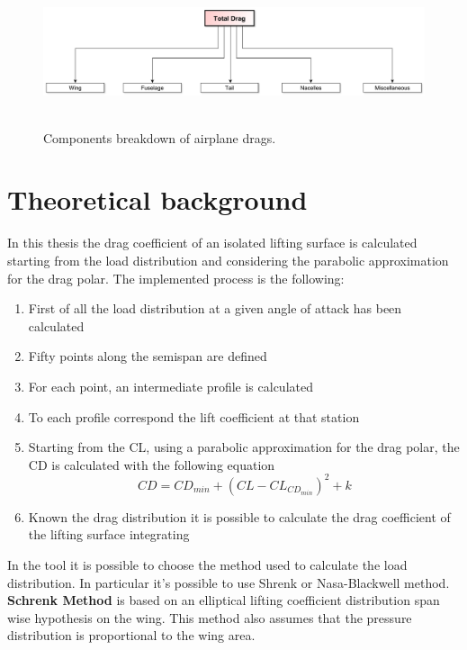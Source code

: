 \begin{figure}[H]
\centering
{\includegraphics[height=3.6cm]{Immagini/dragco.pdf}} 
\caption{Components breakdown of airplane drags.}
\end{figure}

\section{Theoretical background}

In this thesis the drag coefficient of an isolated lifting surface is calculated starting from the load distribution and considering the parabolic approximation for the drag polar. The implemented process is the following:

\begin{enumerate}
\item First of all the load distribution at a given angle of attack has been calculated
\item Fifty points along the semispan are defined
\item For each point, an intermediate profile is calculated
\item To each profile correspond the lift coefficient at that station
\item Starting from the CL, using a parabolic approximation for the drag polar, the CD is calculated with the following equation
\begin{equation}
CD = CD_{min} + (CL - CL_{CD_{min}})^2 + k
\end{equation}
\item Known the drag distribution it is possible to calculate the drag coefficient of the lifting surface integrating
\end{enumerate}

In the tool it is possible to choose the method used to calculate the load distribution. In particular it's possible to use Shrenk or Nasa-Blackwell method.\\

{\bfseries Schrenk Method} is based on an elliptical lifting coefficient distribution span wise hypothesis on the wing. This method also assumes that the pressure distribution is proportional to the wing area. \\ 


